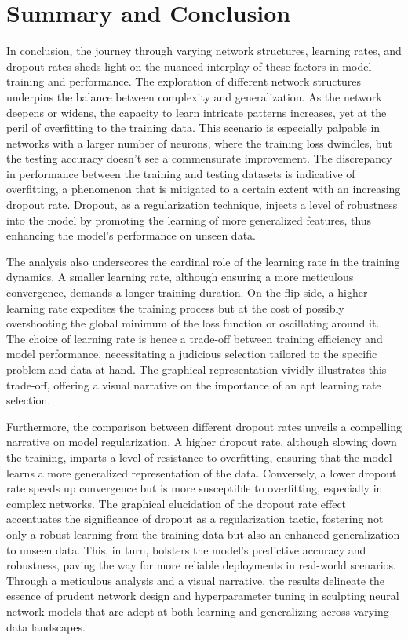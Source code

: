 \documentclass[10pt,twocolumn,letterpaper]{article}
\begin{document}
\section{Summary and Conclusion}

In conclusion, the journey through varying network structures, learning rates, and dropout rates sheds light on the nuanced interplay of these factors in model training and performance. The exploration of different network structures underpins the balance between complexity and generalization. As the network deepens or widens, the capacity to learn intricate patterns increases, yet at the peril of overfitting to the training data. This scenario is especially palpable in networks with a larger number of neurons, where the training loss dwindles, but the testing accuracy doesn't see a commensurate improvement. The discrepancy in performance between the training and testing datasets is indicative of overfitting, a phenomenon that is mitigated to a certain extent with an increasing dropout rate. Dropout, as a regularization technique, injects a level of robustness into the model by promoting the learning of more generalized features, thus enhancing the model's performance on unseen data.

The analysis also underscores the cardinal role of the learning rate in the training dynamics. A smaller learning rate, although ensuring a more meticulous convergence, demands a longer training duration. On the flip side, a higher learning rate expedites the training process but at the cost of possibly overshooting the global minimum of the loss function or oscillating around it. The choice of learning rate is hence a trade-off between training efficiency and model performance, necessitating a judicious selection tailored to the specific problem and data at hand. The graphical representation vividly illustrates this trade-off, offering a visual narrative on the importance of an apt learning rate selection.

Furthermore, the comparison between different dropout rates unveils a compelling narrative on model regularization. A higher dropout rate, although slowing down the training, imparts a level of resistance to overfitting, ensuring that the model learns a more generalized representation of the data. Conversely, a lower dropout rate speeds up convergence but is more susceptible to overfitting, especially in complex networks. The graphical elucidation of the dropout rate effect accentuates the significance of dropout as a regularization tactic, fostering not only a robust learning from the training data but also an enhanced generalization to unseen data. This, in turn, bolsters the model's predictive accuracy and robustness, paving the way for more reliable deployments in real-world scenarios. Through a meticulous analysis and a visual narrative, the results delineate the essence of prudent network design and hyperparameter tuning in sculpting neural network models that are adept at both learning and generalizing across varying data landscapes.




{\small
   
   
}
\end{document}
